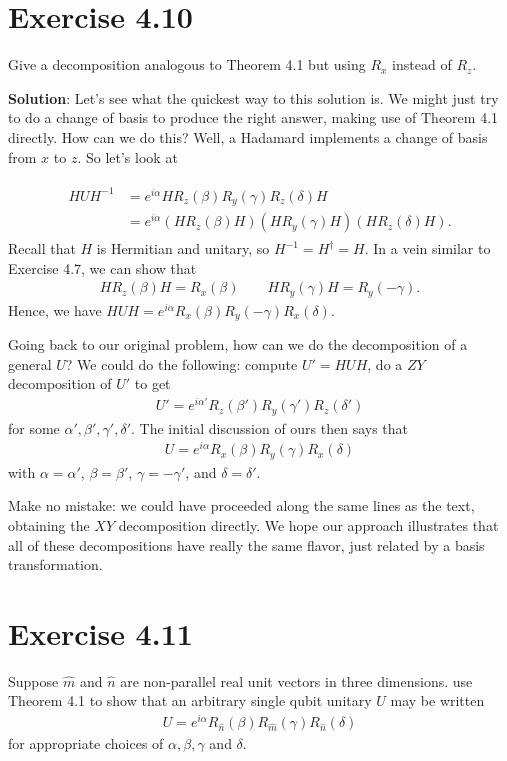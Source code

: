 \documentclass{book}
\begin{document}
\section*{Exercise 4.10}
    Give a decomposition analogous to Theorem 4.1 but using $R_x$ instead of $R_z$.

    \textbf{Solution}: Let's see what the quickest way to this solution is. We might just try to do a change of basis to produce the right answer, making use of Theorem 4.1 directly. How can we do this? Well, a Hadamard implements a change of basis from $x$ to $z$. So let's look at

    \begin{align}
    \begin{aligned}
        H U H^{-1} &= e^{i\alpha} H R_z(\beta) R_y(\gamma) R_z(\delta) H \\
        &=e^{i\alpha} \left(H R_z(\beta)H\right) \left(H R_y(\gamma) H\right) \left( H R_z(\delta) H\right).
    \end{aligned}
    \end{align}
    Recall that $H$ is Hermitian and unitary, so $H^{-1} = H^\dagger = H$. In a vein similar to Exercise 4.7, we can show that
    \begin{align}
        H R_z(\beta) H = R_x(\beta) \qquad H R_y(\gamma) H = R_y(-\gamma). 
    \end{align}
    Hence, we have $HUH = e^{i\alpha} R_x(\beta) R_y(-\gamma) R_x(\delta)$.

    Going back to our original problem, how can we do the decomposition of a general $U$? We could do the following: compute $U' = HUH$, do a $ZY$ decomposition of $U'$ to get
    \begin{align}
        U' = e^{i\alpha'}  R_z(\beta') R_y(\gamma') R_z(\delta') 
    \end{align}
    for some $\alpha', \beta', \gamma', \delta'$. The initial discussion of ours then says that 
    \begin{align}
        U = e^{i\alpha} R_x(\beta) R_y(\gamma) R_x(\delta)
    \end{align}
    with $\alpha = \alpha'$, $\beta = \beta'$, $\gamma = -\gamma'$, and $\delta = \delta'$.

    Make no mistake: we could have proceeded along the same lines as the text, obtaining the $XY$ decomposition directly. We hope our approach illustrates that all of these decompositions have really the same flavor, just related by a basis transformation.

\section*{Exercise 4.11}
    Suppose $\hat{m}$ and $\hat{n}$ are non-parallel real unit vectors in three dimensions. use Theorem 4.1 to show that an arbitrary single qubit unitary $U$ may be written
    \begin{align}
        U = e^{i\alpha} R_{\hat{n}}(\beta) R_{\hat{m}}(\gamma) R_{\hat{n}}(\delta)
    \end{align}
    for appropriate choices of $\alpha, \beta, \gamma$ and $\delta$.
\end{document}
